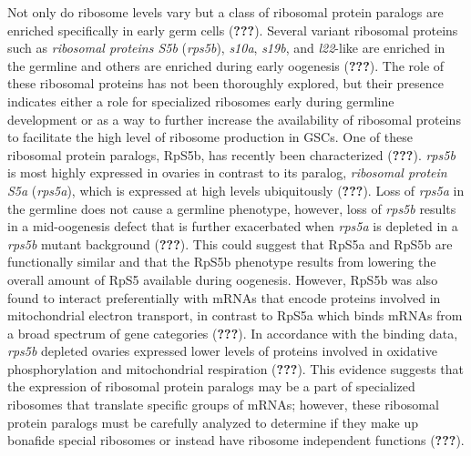 \documentclass[12pt,oneside]{reedthesis}
\begin{document}
Not only do ribosome levels vary but a class of ribosomal protein
paralogs are enriched specifically in early germ cells ({\textbf{???}}).
Several variant ribosomal proteins such as \emph{ribosomal proteins S5b}
(\emph{rps5b}), \emph{s10a}, \emph{s19b}, and \emph{l22}-like are enriched in the germline
and others are enriched during early oogenesis ({\textbf{???}}). The role
of these ribosomal proteins has not been thoroughly explored, but their
presence indicates either a role for specialized ribosomes early during
germline development or as a way to further increase the availability of
ribosomal proteins to facilitate the high level of ribosome production
in GSCs. One of these ribosomal protein paralogs, RpS5b, has recently
been characterized ({\textbf{???}}). \emph{rps5b} is most highly expressed in
ovaries in contrast to its paralog, \emph{ribosomal protein S5a} (\emph{rps5a}),
which is expressed at high levels ubiquitously ({\textbf{???}}). Loss of
\emph{rps5a} in the germline does not cause a germline phenotype, however,
loss of \emph{rps5b} results in a mid-oogenesis defect that is further
exacerbated when \emph{rps5a} is depleted in a \emph{rps5b} mutant background
({\textbf{???}}). This could suggest that RpS5a and RpS5b are functionally
similar and that the RpS5b phenotype results from lowering the overall
amount of RpS5 available during oogenesis. However, RpS5b was also found
to interact preferentially with mRNAs that encode proteins involved in
mitochondrial electron transport, in contrast to RpS5a which binds mRNAs
from a broad spectrum of gene categories ({\textbf{???}}). In accordance
with the binding data, \emph{rps5b} depleted ovaries expressed lower levels
of proteins involved in oxidative phosphorylation and mitochondrial
respiration ({\textbf{???}}). This evidence suggests that the expression
of ribosomal protein paralogs may be a part of specialized ribosomes
that translate specific groups of mRNAs; however, these ribosomal
protein paralogs must be carefully analyzed to determine if they make up
bonafide special ribosomes or instead have ribosome independent
functions ({\textbf{???}}).
\end{document}
